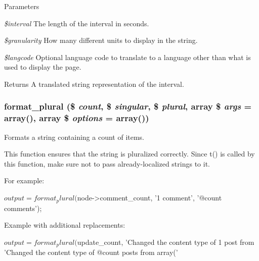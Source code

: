 \begin{DoxyParams}{Parameters}
\item[{\em \$interval}]The length of the interval in seconds. \item[{\em \$granularity}]How many different units to display in the string. \item[{\em \$langcode}]Optional language code to translate to a language other than what is used to display the page.\end{DoxyParams}
\begin{DoxyReturn}{Returns}
A translated string representation of the interval. 
\end{DoxyReturn}
\hypertarget{group__format_ga215a60b10cd70858e7a268eaf04cbed7}{
\subsubsection[{format\_\-plural}]{\setlength{\rightskip}{0pt plus 5cm}format\_\-plural (\$ {\em count}, \/  \$ {\em singular}, \/  \$ {\em plural}, \/  array \$ {\em args} = {\ttfamily array()}, \/  array \$ {\em options} = {\ttfamily array()})}}
\label{group__format_ga215a60b10cd70858e7a268eaf04cbed7}
Formats a string containing a count of items.

This function ensures that the string is pluralized correctly. Since t() is called by this function, make sure not to pass already-\/localized strings to it.

For example: 
\begin{DoxyCode}
   $output = format_plural($node->comment_count, '1 comment', '@count comments');
      
\end{DoxyCode}


Example with additional replacements: 
\begin{DoxyCode}
   $output = format_plural($update_count,
     'Changed the content type of 1 post from %
     'Changed the content type of @count posts from %
     array('%
\end{DoxyCode}



